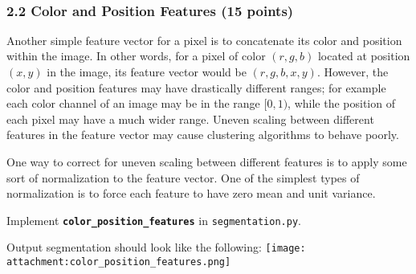 \documentclass[11pt]{article}
\makeatletter
\def\maxwidth{\ifdim\Gin@nat@width>\linewidth\linewidth
    \else\Gin@nat@width\fi}
\let\Oldincludegraphics\includegraphics
\renewcommand{\includegraphics}[1]{\Oldincludegraphics[width=.8\maxwidth]{#1}}
\makeatother
\begin{document}
    \begin{center}
    \end{center}
    { \hspace*{\fill} \\}
    
    \hypertarget{color-and-position-features-15-points}{%
\subsubsection{2.2 Color and Position Features (15
points)}\label{color-and-position-features-15-points}}

Another simple feature vector for a pixel is to concatenate its color
and position within the image. In other words, for a pixel of color
\((r, g, b)\) located at position \((x, y)\) in the image, its feature
vector would be \((r, g, b, x, y)\). However, the color and position
features may have drastically different ranges; for example each color
channel of an image may be in the range \([0, 1)\), while the position
of each pixel may have a much wider range. Uneven scaling between
different features in the feature vector may cause clustering algorithms
to behave poorly.

One way to correct for uneven scaling between different features is to
apply some sort of normalization to the feature vector. One of the
simplest types of normalization is to force each feature to have zero
mean and unit variance.

Implement \textbf{\texttt{color\_position\_features}} in
\texttt{segmentation.py}.

Output segmentation should look like the following:
\texttt{[image: attachment:color\_position\_features.png]}
\end{document}
